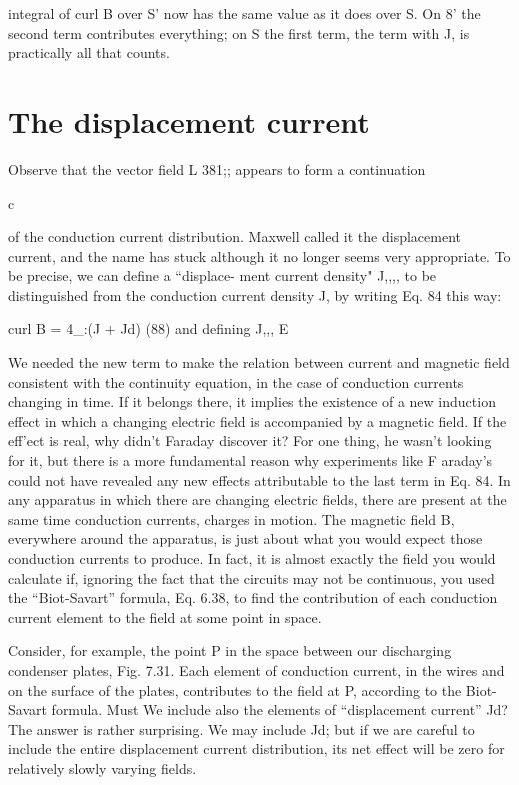 integral of curl B over S' now has the same value as it does over S.
On 8' the second term contributes everything; on S the first term, the
term with J, is practically all that counts.

\section{The displacement current}

Observe that the vector field L 381;; appears to form a continuation

c

of the conduction current distribution. Maxwell called it the displacement
current, and the name has stuck although it no longer
seems very appropriate. To be precise, we can define a ``displace-
ment current density" J,,,, to be distinguished from the conduction
current density J, by writing Eq. 84 this way:

curl B = 4_:(J + Jd) (88)
and defining J,,, E 

We needed the new term to make the relation between current and
magnetic field consistent with the continuity equation, in the case
of conduction currents changing in time. If it belongs there, it
implies the existence of a new induction effect in which a changing
electric field is accompanied by a magnetic field. If the eff'ect is real,
why didn't Faraday discover it? For one thing, he wasn't looking
for it, but there is a more fundamental reason why experiments like
F araday's could not have revealed any new effects attributable to the
last term in Eq. 84. In any apparatus in which there are changing
electric fields, there are present at the same time conduction currents,
charges in motion. The magnetic field B, everywhere around the
apparatus, is just about what you would expect those conduction
currents to produce. In fact, it is almost exactly the field you would
calculate if, ignoring the fact that the circuits may not be continuous,
you used the ``Biot-Savart'' formula, Eq. 6.38, to find the contribution
of each conduction current element to the field at some point in space.

Consider, for example, the point P in the space between our discharging
condenser plates, Fig. 7.31. Each element of conduction
current, in the wires and on the surface of the plates, contributes to
the field at P, according to the Biot-Savart formula. Must We include
also the elements of ``displacement current'' Jd? The answer is rather
surprising. We may include Jd; but if we are careful to include the
entire displacement current distribution, its net effect will be zero for
relatively slowly varying fields.

